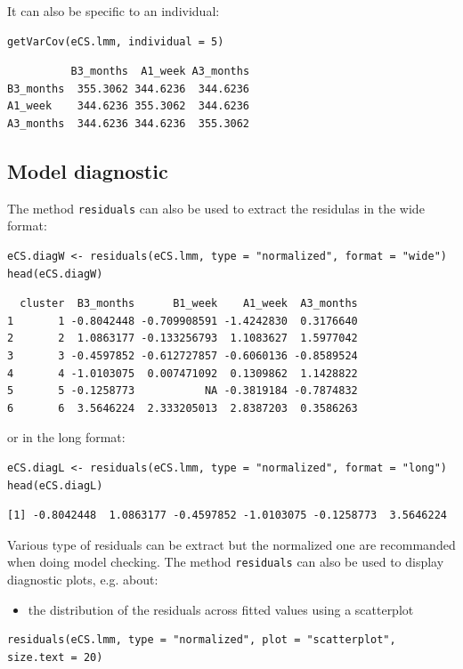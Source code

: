 \documentclass[12pt]{article}
\begin{document}
It can also be specific to an individual:
\lstset{language=r,label= ,caption= ,captionpos=b,numbers=none}
\begin{lstlisting}
getVarCov(eCS.lmm, individual = 5)
\end{lstlisting}

\begin{verbatim}
          B3_months  A1_week A3_months
B3_months  355.3062 344.6236  344.6236
A1_week    344.6236 355.3062  344.6236
A3_months  344.6236 344.6236  355.3062
\end{verbatim}


\clearpage

\subsection{Model diagnostic}
\label{sec:orgaf5998f}

The method \texttt{residuals} can also be used to extract the residulas in
the wide format:
\lstset{language=r,label= ,caption= ,captionpos=b,numbers=none}
\begin{lstlisting}
eCS.diagW <- residuals(eCS.lmm, type = "normalized", format = "wide")
head(eCS.diagW)
\end{lstlisting}

\begin{verbatim}
  cluster  B3_months      B1_week    A1_week  A3_months
1       1 -0.8042448 -0.709908591 -1.4242830  0.3176640
2       2  1.0863177 -0.133256793  1.1083627  1.5977042
3       3 -0.4597852 -0.612727857 -0.6060136 -0.8589524
4       4 -1.0103075  0.007471092  0.1309862  1.1428822
5       5 -0.1258773           NA -0.3819184 -0.7874832
6       6  3.5646224  2.333205013  2.8387203  0.3586263
\end{verbatim}


or in the long format:
\lstset{language=r,label= ,caption= ,captionpos=b,numbers=none}
\begin{lstlisting}
eCS.diagL <- residuals(eCS.lmm, type = "normalized", format = "long")
head(eCS.diagL)
\end{lstlisting}

\begin{verbatim}
[1] -0.8042448  1.0863177 -0.4597852 -1.0103075 -0.1258773  3.5646224
\end{verbatim}


Various type of residuals can be extract but the normalized one are
recommanded when doing model checking. The method \texttt{residuals} can also
be used to display diagnostic plots, e.g. about:
\begin{itemize}
\item the distribution of the residuals across fitted values using a
scatterplot
\end{itemize}
\lstset{language=r,label= ,caption= ,captionpos=b,numbers=none}
\begin{lstlisting}
residuals(eCS.lmm, type = "normalized", plot = "scatterplot", size.text = 20)
\end{lstlisting}
\end{document}
